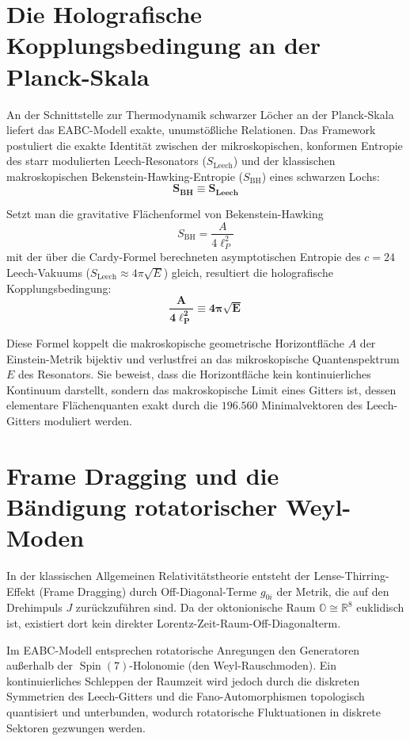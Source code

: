 \documentclass[11pt,a4paper]{article}
\begin{document}
\section{Die Holografische Kopplungsbedingung an der Planck-Skala}

An der Schnittstelle zur Thermodynamik schwarzer Löcher an der Planck-Skala liefert das EABC-Modell exakte, unumstößliche Relationen. Das Framework postuliert die exakte Identität zwischen der mikroskopischen, konformen Entropie des starr modulierten Leech-Resonators ($S_{\text{Leech}}$) und der klassischen makroskopischen Bekenstein-Hawking-Entropie ($S_{\text{BH}}$) eines schwarzen Lochs:
\begin{equation}
    \mathbf{S_{\text{BH}} \equiv S_{\text{Leech}}}
\end{equation}

Setzt man die gravitative Flächenformel von Bekenstein-Hawking
\begin{equation}
    S_{\text{BH}} = \frac{A}{4\ell_P^2}
\end{equation}
mit der über die Cardy-Formel berechneten asymptotischen Entropie des $c=24$ Leech-Vakuums ($S_{\text{Leech}} \approx 4\pi\sqrt{E}$) gleich, resultiert die holografische Kopplungsbedingung:
\begin{equation}
    \mathbf{\frac{A}{4\ell_P^2} \equiv 4\pi \sqrt{E}}
\end{equation}

Diese Formel koppelt die makroskopische geometrische Horizontfläche $A$ der Einstein-Metrik bijektiv und verlustfrei an das mikroskopische Quantenspektrum $E$ des Resonators. Sie beweist, dass die Horizontfläche kein kontinuierliches Kontinuum darstellt, sondern das makroskopische Limit eines Gitters ist, dessen elementare Flächenquanten exakt durch die $196.560$ Minimalvektoren des Leech-Gitters moduliert werden.

\section{Frame Dragging und die Bändigung rotatorischer Weyl-Moden}

In der klassischen Allgemeinen Relativitätstheorie entsteht der Lense-Thirring-Effekt (Frame Dragging) durch Off-Diagonal-Terme $g_{0i}$ der Metrik, die auf den Drehimpuls $J$ zurückzuführen sind. Da der oktonionische Raum $\mathbb{O} \cong \mathbb{R}^8$ euklidisch ist, existiert dort kein direkter Lorentz-Zeit-Raum-Off-Diagonalterm.

Im EABC-Modell entsprechen rotatorische Anregungen den Generatoren außerhalb der $\operatorname{Spin}(7)$-Holonomie (den Weyl-Rauschmoden). Ein kontinuierliches Schleppen der Raumzeit wird jedoch durch die diskreten Symmetrien des Leech-Gitters und die Fano-Automorphismen topologisch quantisiert und unterbunden, wodurch rotatorische Fluktuationen in diskrete Sektoren gezwungen werden.
\end{document}
